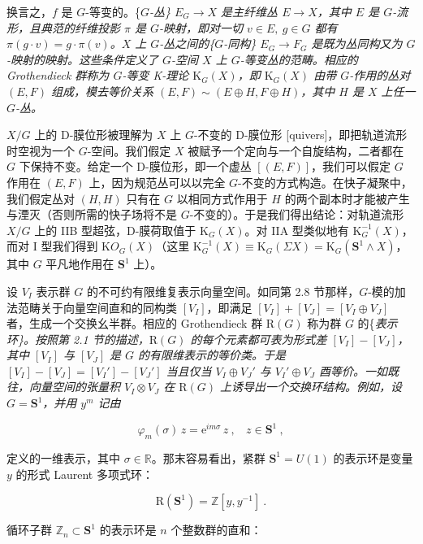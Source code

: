\documentclass[11pt,a4paper]{ctexart}
\begin{document}
换言之，\(f\) 是 \(G\)-等变的。\{\it $G$-丛\} \(E_G\rightarrow X\) 是主纤维丛 \(E\rightarrow X\)，其中 \(E\) 是 \(G\)-流形，且典范的纤维投影 \(\pi\) 是 \(G\)-映射，即对一切 \(v\in E,\ g\in G\) 都有 \(\pi(g\cdot v)=g\cdot \pi(v)\)。\(X\) 上 \(G\)-丛之间的\{\it $G$-同构\} \(E_G\rightarrow F_G\) 是既为丛同构又为 \(G\)-映射的映射。这些条件定义了 \(G\)-空间 \(X\) 上 \(G\)-等变丛的范畴。相应的 Grothendieck 群称为 \(G\)-等变 K-理论 \({\mathrm K}_{G}(X)\)，即 \({\mathrm K}_{G}(X)\) 由带 \(G\)-作用的丛对 \((E,F)\) 组成，模去等价关系 \((E,F)\sim (E\oplus H, F\oplus H)\)，其中 \(H\) 是 \(X\) 上任一 \(G\)-丛。

\(X/G\) 上的 D-膜位形被理解为 \(X\) 上 \(G\)-不变的 D-膜位形 [quivers]，即把轨道流形时空视为一个 \(G\)-空间。我们假定 \(X\) 被赋予一个定向与一个自旋结构，二者都在 \(G\) 下保持不变。给定一个 D-膜位形，即一个虚丛 \([(E,F)]\)，我们可以假定 \(G\) 作用在 \((E,F)\) 上，因为规范丛可以以完全 \(G\)-不变的方式构造。在快子凝聚中，我们假定丛对 \((H,H)\) 只有在 \(G\) 以相同方式作用于 \(H\) 的两个副本时才能被产生与湮灭（否则所需的快子场将不是 \(G\)-不变的）。于是我们得出结论：对轨道流形 \(X/G\) 上的 IIB 型超弦，D-膜荷取值于 \({\mathrm K}_G(X)\)。对 IIA 型类似地有 \({\mathrm K}^{-1}_{G}(X)\)，而对 I 型我们得到 \({\mathrm KO}_{G}(X)\)（这里 \({\mathrm K}_G^{-1}(X)\equiv {\mathrm K}_{G}(\Sigma X)={\mathrm K}_{G}({\mathbf S}^1\wedge X)\)，其中 \(G\) 平凡地作用在 \({\mathbf S}^1\) 上）。

设 \(V_I\) 表示群 \(G\) 的不可约有限维复表示向量空间。如同第 2.8 节那样，\(G\)-模的加法范畴关于向量空间直和的同构类 \([V_I]\)，即满足 \([V_I]+[V_J]=[V_I\oplus V_J]\) 者，生成一个交换幺半群。相应的 Grothendieck 群 \({\mathrm R}(G)\) 称为群 \(G\) 的\{\it 表示环\}。按照第 2.1 节的描述，\({\mathrm R}(G)\) 的每个元素都可表为形式差 \([V_I]-[V_J]\)，其中 \([V_I]\) 与 \([V_J]\) 是 \(G\) 的有限维表示的等价类。于是 \([V_I]-[V_J]=[V_I']-[V_J']\) 当且仅当 \(V_I\oplus V_J'\) 与 \(V_I'\oplus V_J\) 酉等价。一如既往，向量空间的张量积 \(V_I\otimes V_J\) 在 \({\mathrm R}(G)\) 上诱导出一个交换环结构。例如，设 \(G={\mathbf S}^1\)，并用 \(y^m\) 记由

\[\varphi_m(\sigma)\,z=\mbox{e}^{im\sigma}\,z\ , \ \ \ \ z\in {\mathbf S}^1\ ,\]

定义的一维表示，其中 \(\sigma\in{\mathbb{R}}\)。那末容易看出，紧群 \({\mathbf S}^1=U(1)\) 的表示环是变量 \(y\) 的形式 Laurent 多项式环：

\[{\mathrm R}({\mathbf S}^1)={\mathbb{Z}}\left[y,y^{-1}\right]\ .\]

循环子群 \({\mathbb{Z}}_n\subset {\mathbf S}^1\) 的表示环是 \(n\) 个整数群的直和：
\end{document}
